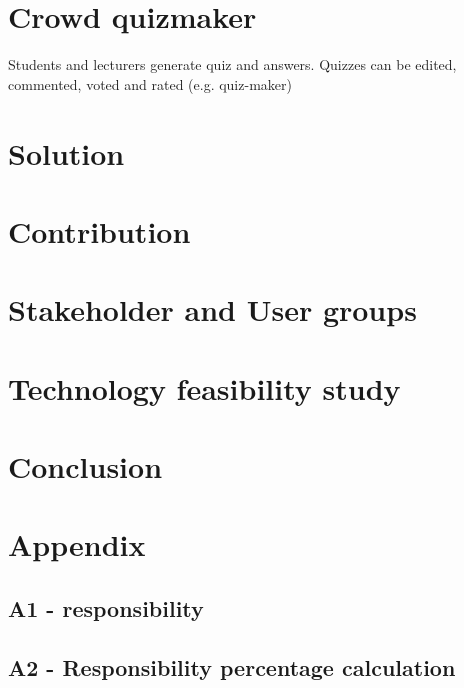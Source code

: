\documentclass[a4paper, 12pt]{report}
\begin{document}
    \pagebreak
    \section*{Crowd quizmaker}
    Students and lecturers generate quiz and answers. Quizzes can be edited, commented, voted and rated (e.g. quiz-maker)

    \section*{Solution}

    \blindtext

    \pagebreak
    \section*{Contribution}

    \blindtext

    \section*{Stakeholder and User groups}

    \blindtext

    \section*{Technology feasibility study}

    \blindtext

    \pagebreak
    \section*{Conclusion}

    \blindtext

    \pagebreak
    \section*{Appendix}
        \subsection*{A1 - responsibility}

        \blinddescription

        \subsection*{A2 - Responsibility percentage calculation}

        \blindtext
    
\end{document}

